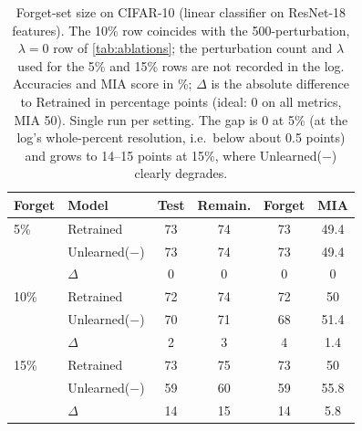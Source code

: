 \begin{table}[t]
  \centering
  \small
  \setlength{\tabcolsep}{4pt}
  \begin{tabular}{@{}llcccc@{}}
    \toprule
    Forget & Model & Test & Remain. & Forget & MIA \\
    \midrule
    5\% & Retrained & 73 & 74 & 73 & 49.4 \\
     & Unlearned($-$) & 73 & 74 & 73 & 49.4 \\
     & $\Delta$ & 0 & 0 & 0 & 0 \\
    \midrule
    10\% & Retrained & 72 & 74 & 72 & 50 \\
     & Unlearned($-$) & 70 & 71 & 68 & 51.4 \\
     & $\Delta$ & 2 & 3 & 4 & 1.4 \\
    \midrule
    15\% & Retrained & 73 & 75 & 73 & 50 \\
     & Unlearned($-$) & 59 & 60 & 59 & 55.8 \\
     & $\Delta$ & 14 & 15 & 14 & 5.8 \\
    \bottomrule
  \end{tabular}
  \caption{Forget-set size on CIFAR-10 (linear classifier on ResNet-18 features). The 10\% row coincides with the 500-perturbation, $\lambda{=}0$ row of \cref{tab:ablations}; the perturbation count and $\lambda$ used for the 5\% and 15\% rows are not recorded in the log. Accuracies and MIA score in \%; $\Delta$ is the absolute difference to Retrained in percentage points (ideal: 0 on all metrics, MIA 50). Single run per setting. The gap is 0 at 5\% (at the log's whole-percent resolution, i.e.\ below about 0.5 points) and grows to 14--15 points at 15\%, where Unlearned($-$) clearly degrades.}
  \label{tab:forget_size}
\end{table}
